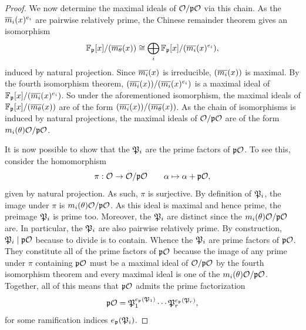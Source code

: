\begin{proof}
      We now determine the maximal ideals of \(\mathcal{O}/\mathfrak{p}\mathcal{O}\) via this chain. As the \(\overline{m}_{i}(x)^{e_{i}}\) are pairwise relatively prime, the Chinese remainder theorem gives an isomorphism
      \[
        \mathbb{F}_{\mathfrak{p}}[x]/(\overline{m_{\theta}}(x)) \cong \bigoplus_{i}\mathbb{F}_{\mathfrak{p}}[x]/(\overline{m_{i}}(x)^{e_{i}}),
      \]
      induced by natural projection. Since \(\overline{m_{i}}(x)\) is irreducible, \((\overline{m_{i}}(x))\) is maximal. By the fourth isomorphism theorem, \((\overline{m_{i}}(x))/(\overline{m_{i}}(x)^{e_{i}})\) is a maximal ideal of \(\mathbb{F}_{\mathfrak{p}}[x]/(\overline{m_{i}}(x)^{e_{i}})\). So under the aforementioned isomorphism, the maximal ideals of \(\mathbb{F}_{\mathfrak{p}}[x]/(\overline{m_{\theta}}(x))\) are of the form \((\overline{m_{i}}(x))/(\overline{m_{\theta}}(x))\). As the chain of isomorphisms is induced by natural projections, the maximal ideals of \(\mathcal{O}/\mathfrak{p}\mathcal{O}\) are of the form \(m_{i}(\theta)\mathcal{O}/\mathfrak{p}\mathcal{O}\).
      
      It is now possible to show that the \(\mathfrak{P}_{i}\) are the prime factors of \(\mathfrak{p}\mathcal{O}\). To see this, consider the homomorphism
      \[
        \pi:\mathcal{O} \to \mathcal{O}/\mathfrak{p}\mathcal{O} \qquad \alpha \mapsto \alpha+\mathfrak{p}\mathcal{O},
      \]
      given by natural projection. As such, \(\pi\) is surjective. By definition of \(\mathfrak{P}_{i}\), the image under \(\pi\) is \(m_{i}(\theta)\mathcal{O}/\mathfrak{p}\mathcal{O}\). As this ideal is maximal and hence prime, the preimage \(\mathfrak{P}_{i}\) is prime too. Moreover, the \(\mathfrak{P}_{i}\) are distinct since the \(m_{i}(\theta)\mathcal{O}/\mathfrak{p}\mathcal{O}\) are. In particular, the \(\mathfrak{P}_{i}\) are also pairwise relatively prime. By construction, \(\mathfrak{P}_{i} \mid \mathfrak{p}\mathcal{O}\) because to divide is to contain. Whence the \(\mathfrak{P}_{i}\) are prime factors of \(\mathfrak{p}\mathcal{O}\). They constitute all of the prime factors of \(\mathfrak{p}\mathcal{O}\) because the image of any prime under \(\pi\) containing \(\mathfrak{p}\mathcal{O}\) must be a maximal ideal of \(\mathcal{O}/\mathfrak{p}\mathcal{O}\) by the fourth isomorphism theorem and every maximal ideal is one of the \(m_{i}(\theta)\mathcal{O}/\mathfrak{p}\mathcal{O}\). Together, all of this means that \(\mathfrak{p}\mathcal{O}\) admits the prime factorization
      \[
        \mathfrak{p}\mathcal{O} = \mathfrak{P}_{1}^{e_{\mathfrak{p}}(\mathfrak{P}_{1})} \cdots \mathfrak{P}_{r}^{e_{\mathfrak{p}}(\mathfrak{P}_{r})},
      \]
      for some ramification indices \(e_{\mathfrak{p}}(\mathfrak{P}_{i})\).


\end{proof}
